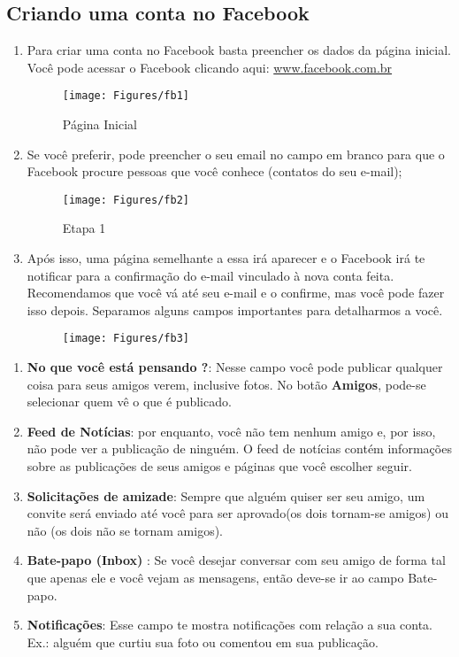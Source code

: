 \documentclass[hidelinks,12pt]{article}
\begin{document}
\subsection{Criando uma conta no Facebook}
	\begin{enumerate}
		\item Para criar uma conta no Facebook basta preencher os dados da página inicial. Você pode acessar o Facebook clicando aqui: \url{www.facebook.com.br}

		\begin{figure}[!h]
			\centering
			\texttt{[image: Figures/fb1]}
			\label{fig:paginafb}
			\caption{Página Inicial}
		\end{figure}

		\item Se você preferir, pode preencher o seu email no campo em branco para que o Facebook procure pessoas que você conhece (contatos do seu e-mail);

		\begin{figure}[!h]
			\centering
			\texttt{[image: Figures/fb2]}
			\label{fig:paginaf2}
			\caption{Etapa 1}
		\end{figure}

		\item Após isso, uma página semelhante a essa irá aparecer e o Facebook irá te notificar para a confirmação do e-mail vinculado à nova conta feita. Recomendamos que você vá até seu e-mail e o confirme, mas você pode fazer isso depois.
		Separamos alguns campos importantes para detalharmos a você.

		\begin{figure}[!h]
			\centering
			\texttt{[image: Figures/fb3]}
			\label{fig:paginaf3}
		\end{figure}

	\end{enumerate}

	\begin{enumerate}
		\item \textbf{No que você está pensando ?}: Nesse campo você pode publicar qualquer coisa para seus amigos verem, inclusive fotos. No botão \textbf{Amigos}, pode-se selecionar quem vê o que é publicado.
		\item \textbf{Feed de Notícias}: por enquanto, você não tem nenhum amigo e, por isso, não pode ver a publicação de ninguém. O feed de notícias contém informações sobre as publicações de seus amigos e páginas que você escolher seguir.
		\item \textbf{Solicitações de amizade}: Sempre que alguém quiser ser seu amigo, um convite será enviado até você para ser aprovado(os dois tornam-se amigos) ou não (os dois não se tornam amigos).
		\item \textbf{Bate-papo (Inbox) }: Se você desejar conversar com seu amigo de forma tal que apenas ele e você vejam as mensagens, então deve-se ir ao campo Bate-papo.
		\item \textbf{Notificações}: Esse campo te mostra notificações com relação a sua conta. Ex.: alguém que curtiu sua foto ou comentou em sua publicação.
	\end{enumerate}
\end{document}

